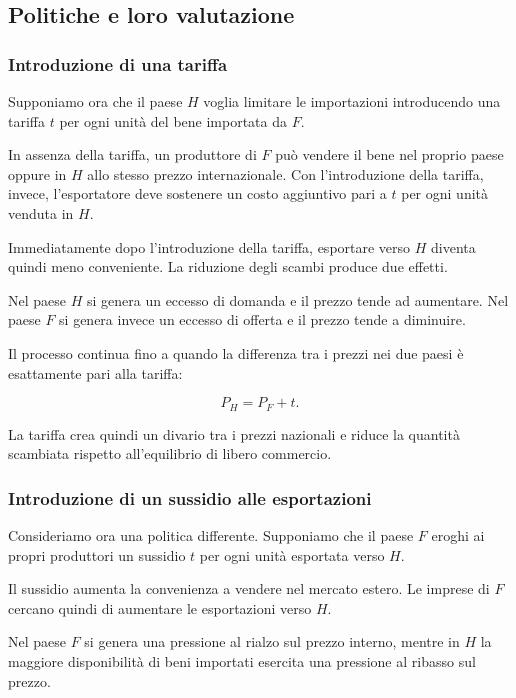 \subsection{Politiche e loro valutazione}

\subsubsection{Introduzione di una tariffa}

Supponiamo ora che il paese $H$ voglia limitare le importazioni
introducendo una tariffa $t$ per ogni unità del bene importata da
$F$.

In assenza della tariffa, un produttore di $F$ può vendere il bene
nel proprio paese oppure in $H$ allo stesso prezzo internazionale.
Con l'introduzione della tariffa, invece, l'esportatore deve
sostenere un costo aggiuntivo pari a $t$ per ogni unità venduta
in $H$.

Immediatamente dopo l'introduzione della tariffa, esportare verso
$H$ diventa quindi meno conveniente. La riduzione degli scambi
produce due effetti.

Nel paese $H$ si genera un eccesso di domanda e il prezzo tende
ad aumentare. Nel paese $F$ si genera invece un eccesso di offerta
e il prezzo tende a diminuire.

Il processo continua fino a quando la differenza tra i prezzi nei
due paesi è esattamente pari alla tariffa:

\begin{equation*}
    P_H=P_F+t.
    \label{eq:tariffa-prezzi}
\end{equation*}

La tariffa crea quindi un divario tra i prezzi nazionali e riduce
la quantità scambiata rispetto all'equilibrio di libero commercio.


\subsubsection{Introduzione di un sussidio alle esportazioni}

Consideriamo ora una politica differente. Supponiamo che il paese
$F$ eroghi ai propri produttori un sussidio $t$ per ogni unità
esportata verso $H$.

Il sussidio aumenta la convenienza a vendere nel mercato estero.
Le imprese di $F$ cercano quindi di aumentare le esportazioni verso
$H$.

Nel paese $F$ si genera una pressione al rialzo sul prezzo interno,
mentre in $H$ la maggiore disponibilità di beni importati esercita
una pressione al ribasso sul prezzo.


